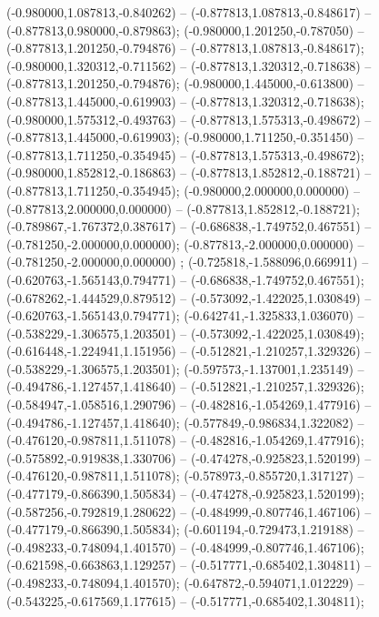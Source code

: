  (-0.980000,1.087813,-0.840262) -- (-0.877813,1.087813,-0.848617) -- (-0.877813,0.980000,-0.879863);
 (-0.980000,1.201250,-0.787050) -- (-0.877813,1.201250,-0.794876) -- (-0.877813,1.087813,-0.848617);
 (-0.980000,1.320312,-0.711562) -- (-0.877813,1.320312,-0.718638) -- (-0.877813,1.201250,-0.794876);
 (-0.980000,1.445000,-0.613800) -- (-0.877813,1.445000,-0.619903) -- (-0.877813,1.320312,-0.718638);
 (-0.980000,1.575312,-0.493763) -- (-0.877813,1.575313,-0.498672) -- (-0.877813,1.445000,-0.619903);
 (-0.980000,1.711250,-0.351450) -- (-0.877813,1.711250,-0.354945) -- (-0.877813,1.575313,-0.498672);
 (-0.980000,1.852812,-0.186863) -- (-0.877813,1.852812,-0.188721) -- (-0.877813,1.711250,-0.354945);
 (-0.980000,2.000000,0.000000) -- (-0.877813,2.000000,0.000000) -- (-0.877813,1.852812,-0.188721);
 (-0.789867,-1.767372,0.387617) -- (-0.686838,-1.749752,0.467551) -- (-0.781250,-2.000000,0.000000);
 (-0.877813,-2.000000,0.000000) -- (-0.781250,-2.000000,0.000000) ;
 (-0.725818,-1.588096,0.669911) -- (-0.620763,-1.565143,0.794771) -- (-0.686838,-1.749752,0.467551);
 (-0.678262,-1.444529,0.879512) -- (-0.573092,-1.422025,1.030849) -- (-0.620763,-1.565143,0.794771);
 (-0.642741,-1.325833,1.036070) -- (-0.538229,-1.306575,1.203501) -- (-0.573092,-1.422025,1.030849);
 (-0.616448,-1.224941,1.151956) -- (-0.512821,-1.210257,1.329326) -- (-0.538229,-1.306575,1.203501);
 (-0.597573,-1.137001,1.235149) -- (-0.494786,-1.127457,1.418640) -- (-0.512821,-1.210257,1.329326);
 (-0.584947,-1.058516,1.290796) -- (-0.482816,-1.054269,1.477916) -- (-0.494786,-1.127457,1.418640);
 (-0.577849,-0.986834,1.322082) -- (-0.476120,-0.987811,1.511078) -- (-0.482816,-1.054269,1.477916);
 (-0.575892,-0.919838,1.330706) -- (-0.474278,-0.925823,1.520199) -- (-0.476120,-0.987811,1.511078);
 (-0.578973,-0.855720,1.317127) -- (-0.477179,-0.866390,1.505834) -- (-0.474278,-0.925823,1.520199);
 (-0.587256,-0.792819,1.280622) -- (-0.484999,-0.807746,1.467106) -- (-0.477179,-0.866390,1.505834);
 (-0.601194,-0.729473,1.219188) -- (-0.498233,-0.748094,1.401570) -- (-0.484999,-0.807746,1.467106);
 (-0.621598,-0.663863,1.129257) -- (-0.517771,-0.685402,1.304811) -- (-0.498233,-0.748094,1.401570);
 (-0.647872,-0.594071,1.012229) -- (-0.543225,-0.617569,1.177615) -- (-0.517771,-0.685402,1.304811);
